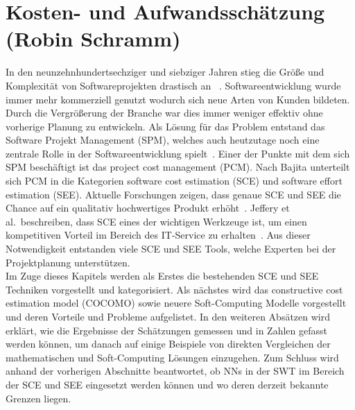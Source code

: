 \section[Kosten- und Aufwandsschätzung (Robin Schramm)]{\large  Kosten- und Aufwandsschätzung (Robin Schramm)} \label{KostenAufwand}
In den neunzehnhundertsechziger und siebziger Jahren stieg die Größe und Komplexität von Softwareprojekten drastisch an ~\cite{Bajta2018}. Softwareentwicklung wurde immer mehr kommerziell genutzt wodurch sich neue Arten von Kunden bildeten. Durch die Vergrößerung der Branche war dies immer weniger effektiv ohne vorherige Planung zu entwickeln. Als Lösung für das Problem entstand das Software Projekt Management (SPM), welches auch heutzutage noch eine zentrale Rolle in der Softwareentwicklung spielt~\cite{Bajta2018}. Einer der Punkte mit dem sich SPM beschäftigt ist das project cost management (PCM). Nach Bajita \cite{Bajta2018} unterteilt sich PCM in die Kategorien software cost estimation (SCE) und software effort estimation (SEE). Aktuelle Forschungen zeigen, dass genaue SCE und SEE die Chance auf ein qualitativ hoch\-wertiges Produkt erhöht~\cite{Matson1994}\cite{Bilgaiyan2016}. Jeffery et al.~beschreiben, dass SCE eines der wichtigen Werkzeuge ist, um einen kompetitiven Vorteil im Bereich des IT-Service zu erhalten~\cite{Jeffery1990}. Aus dieser Notwendigkeit entstanden viele SCE und SEE Tools, welche Experten bei der Projektplanung unterstützen.
\\
Im Zuge dieses Kapitels werden als Erstes die bestehenden SCE und SEE Techniken vorgestellt und kategorisiert. Als nächstes wird das constructive cost estimation model (COCOMO) sowie neuere Soft-Computing Modelle vorgestellt und deren Vorteile und Probleme aufgelistet. In den weiteren Absätzen wird erklärt, wie die Ergebnisse der Schätzungen gemessen und in Zahlen  gefasst werden können, um danach auf einige Beispiele von direkten Vergleichen der mathematischen und Soft-Computing Lösungen einzugehen. Zum Schluss wird anhand der vorherigen Abschnitte beantwortet, ob NNs in der SWT im Bereich der SCE und SEE eingesetzt werden können und wo deren derzeit bekannte Grenzen liegen.

